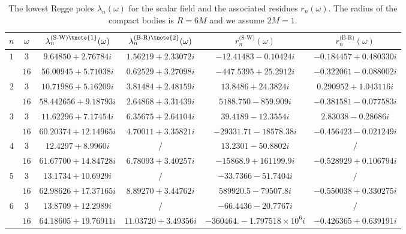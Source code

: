 \documentclass[aps,prd,longbibliography,reprint,twocolumn,amsmath,amssymb,amsfonts,showpacs,superscriptaddress]{revtex4-1}%
\begin{document}
\begingroup
\squeezetable
\begin{table}[htp]
\begin{threeparttable}[htp]
\caption{\label{tab:table2} The lowest Regge poles $\lambda_{n}(\omega)$ for the scalar field and the associated residues $r_{n}(\omega)$. The radius of the compact bodies is $R = 6M$ and we assume $2M=1$.}
\smallskip
\centering
\begin{ruledtabular}
\begin{tabular}{cccccc}
 $n$ & $\omega$  & $\lambda^{\text{(S-W)\tnote{1}}}_n(\omega)$ & $\lambda^{\text{(B-R)\tnote{2}}}_n(\omega)$ & $r^{\text{(S-W)}}_{n}(\omega)$ & $r^{\text{(B-R)}}_{n}(\omega)$
 \\ \hline
$1$  & $3$  & $ 9.64850+2.76784 i$  & $1.56219+2.33072 i$  & $-12.41483-0.10424 i$  & $ -0.184457+0.480330 i$    \\
     & $16$  & $56.00945+5.71038 i$  & $ 0.62529+3.27098 i$  & $-447.5395+25.2912 i$  & $-0.322061-0.088002 i $  \\

$2$  & $3$  & $ 10.71986+5.16209 i $  & $3.81484+2.48159 i$  & $13.8486+24.3824 i$  & $0.290952+1.043116 i$    \\
     & $16$  & $ 58.442656+9.18793 i$ & $2.64868+3.31439 i$  & $5188.750-859.909 i$  & $ -0.381581-0.077583 i$    \\

$3$  & $3$  & $11.62296+7.17454 i$  & $ 6.35675+2.64104 i$  & $39.4189-12.3554 i$ & $2.83038-0.28686 i$    \\
     & $16$  & $60.20374+12.14965 i$  & $4.70011+3.35821 i$  & $-29331.71-18578.38 i$  & $-0.456423-0.021249 i$ \\

$4$  & $3$  & $ 12.4297+8.9960 i$  & $/$  & $ 13.2301-50.8802 i$ & $/$    \\
     & $16$  & $ 61.67700+14.84728 i $  & $6.78093+3.40257 i$  & $-15868.9+161199.9 i$  & $-0.528929+0.106794 i$ \\

$5$  & $3$  & $13.1734+10.6929 i$  & $/$  & $-33.7366-51.7404 i$ & $/$     \\
     & $16$  & $62.98626+17.37165 i$  & $8.89270+3.44762 i$  & $589920.5-79507.8 i$  & $-0.550038+0.330275 i$    \\

$6$  & $3$  & $13.8709+12.2989 i$  & $/$   & $-66.4436-20.7767 i$ & $/$    \\
     & $16$  & $ 64.18605+19.76911 i$  & $11.03720+3.49356 i$  & $-360464.-1.797518\times 10^6 i$  & $ -0.426365+0.639191 i$    \\


\end{tabular}
\end{ruledtabular}
\end{threeparttable}
\end{table}
\end{document}
